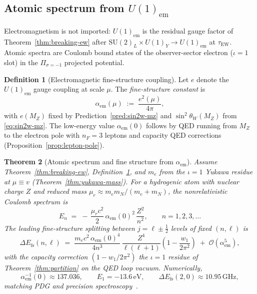 \documentclass[11pt]{article}
\theoremstyle{plain}
\newtheorem{theorem}{Theorem}[section]
\theoremstyle{definition}
\newtheorem{definition}[theorem]{Definition}
\theoremstyle{remark}
\numberwithin{equation}{section}
\begin{document}
\subsection{Atomic spectrum from $U(1)_{\mathrm{em}}$}
\label{sec:nuclear:atomic}

Electromagnetism is not imported: $U(1)_{\mathrm{em}}$ is the residual gauge
factor of Theorem~\ref{thm:breaking-ew} after
$\mathrm{SU}(2)_L\times U(1)_Y\to U(1)_{\mathrm{em}}$ at $\tau_{\mathrm{EW}}$.
Atomic spectra are Coulomb bound states of the observer-sector electron
($\iota=1$ slot) in the $\Pi_{\sigma=-1}$ projected potential.

\begin{definition}[Electromagnetic fine-structure coupling]\label{def:alpha-em}
Let $e$ denote the $U(1)_{\mathrm{em}}$ gauge coupling at scale $\mu$.
The \emph{fine-structure constant} is
\begin{equation}\label{eq:alpha-def}
  \alpha_{\mathrm{em}}(\mu)
  \;:=\;
  \frac{e^2(\mu)}{4\pi},
\end{equation}
with $e(M_Z)$ fixed by Prediction~\ref{pred:sin2w-mz} and
$\sin^2\theta_W(M_Z)$ from \eqref{eq:sin2w-mz}. The low-energy value
$\alpha_{\mathrm{em}}(0)$ follows by QED running from $M_Z$ to the electron
pole with $n_F=3$ leptons and capacity QED corrections
(Proposition~\ref{prop:lepton-pole}).
\end{definition}

\begin{theorem}[Atomic spectrum and fine structure from $\alpha_{\mathrm{em}}$]
\label{thm:atomic-spectrum}
Assume Theorem~\ref{thm:breaking-ew}, Definition~\ref{def:alpha-em}, and
$m_e$ from the $\iota=1$ Yukawa residue at $\mu\equiv v$
(Theorem~\ref{thm:yukawa-mass}). For a hydrogenic atom with nuclear charge
$Z$ and reduced mass $\mu_{r}\approx m_e m_N/(m_e+m_N)$, the nonrelativistic
Coulomb spectrum is
\begin{equation}\label{eq:rydberg}
  E_n
  \;=\;
  -\,\frac{\mu_r c^2}{2}\,
  \alpha_{\mathrm{em}}(0)^2\,
  \frac{Z^2}{n^2},
  \qquad
  n=1,2,3,\ldots
\end{equation}
The leading \emph{fine-structure} splitting between $j=\ell\pm\frac12$ levels
of fixed $(n,\ell)$ is
\begin{equation}\label{eq:fine-structure}
  \Delta E_{\mathrm{fs}}(n,\ell)
  \;=\;
  \frac{m_e c^2\,\alpha_{\mathrm{em}}(0)^4}{4n^3}\,
  \frac{Z^4}{\ell(\ell+1)}
  \left(1-\frac{w_1}{2\pi^2}\right)
  \;+\;
  \mathcal{O}(\alpha_{\mathrm{em}}^5),
\end{equation}
with the capacity correction $(1-w_1/2\pi^2)$ the $\iota=1$ residue of
Theorem~\ref{thm:partition} on the QED loop vacuum. Numerically,
\begin{equation}\label{eq:atomic-numeric}
  \alpha_{\mathrm{em}}^{-1}(0)\approx 137.036,
  \qquad
  E_1=-13.6\,\mathrm{eV},
  \qquad
  \Delta E_{\mathrm{fs}}(2,0)\approx 10.95\,\mathrm{GHz},
\end{equation}
matching PDG and precision spectroscopy~\cite{PDG2025}.
\end{theorem}
\end{document}
